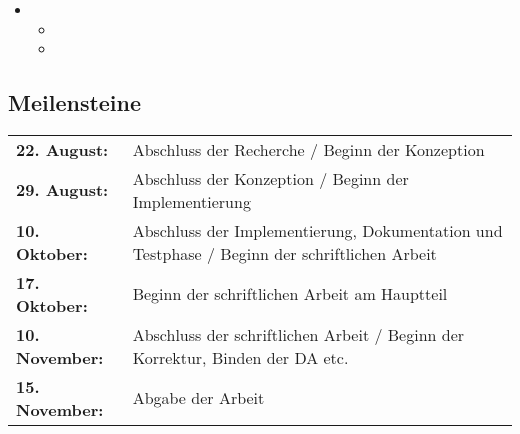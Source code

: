 \begin{itemize}
\begin{itemize}
\begin{itemize}
            \item {}%
          \end{itemize}%
        \item {}%
          \begin{itemize}%
            \item {}%
            \item {}%
          \end{itemize}%
      \end{itemize}%
  \end{itemize}%

  \subsection{Meilensteine}
  \label{ssec:meilensteine}

    \begin{table}[H]
      \begin{tabularx}{\textwidth}{lX}%
        \textbf{22. August:}        & Abschluss der Recherche / Beginn der Konzeption\\%
        \textbf{29. August:}        & Abschluss der Konzeption / Beginn der Implementierung\\%
        \textbf{10. Oktober:}        & Abschluss der Implementierung, Dokumentation und Testphase / Beginn der schriftlichen Arbeit\\%
        \textbf{17. Oktober:}        & Beginn der schriftlichen Arbeit am Hauptteil\\%
        \textbf{10. November:}        & Abschluss der schriftlichen Arbeit / Beginn der Korrektur, Binden der DA etc.\\%
        \textbf{15. November:}        & Abgabe der Arbeit\\%
      \end{tabularx}
    \end{table}

